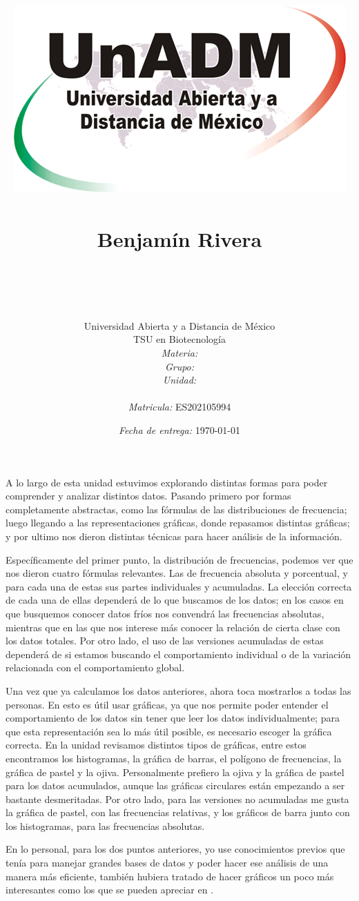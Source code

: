 \documentclass[12pt]{article}
\title{
	\includegraphics{../../../assets/logo-unadm} \\
	\ \\ Benjam\'in Rivera \\
	\bf{\titulo}\\\ \\}
\author{
	Universidad Abierta y a Distancia de México \\
	TSU en Biotecnolog\'ia \\
	\textit{Materia:} \materia \\
	\textit{Grupo:} \grupo \\
	\textit{Unidad:} \unidad \\
	\\
	\textit{Matricula:} ES202105994 }
\date{\textit{Fecha de entrega:} \today}
\begin{document}
\maketitle\newpage

	\par A lo largo de esta unidad estuvimos explorando distintas formas para poder comprender y analizar distintos datos. Pasando primero por formas completamente abstractas, como las fórmulas de las distribuciones de frecuencia; luego llegando a las representaciones gráficas, donde repasamos distintas gráficas; y por ultimo nos dieron distintas técnicas para hacer análisis de la información.
	
	\par Específicamente del primer punto, la distribución de frecuencias, podemos ver que nos dieron cuatro fórmulas relevantes. Las de frecuencia absoluta y porcentual, y para cada una de estas sus partes individuales y acumuladas. La elección correcta de cada una de ellas dependerá de lo que buscamos de los datos; en los casos en que busquemos conocer datos fríos nos convendrá las frecuencias absolutas, mientras que en las que nos interese más conocer la relación de cierta clase con los datos totales. Por otro lado, el uso de las versiones acumuladas de estas dependerá de si estamos buscando el comportamiento individual o de la variación relacionada con el comportamiento global.
	
	\par Una vez que ya calculamos los datos anteriores, ahora toca mostrarlos a todas las personas. En esto es útil usar gráficas, ya que nos permite poder entender el comportamiento de los datos sin tener que leer los datos individualmente; para que esta representación sea lo más útil posible, es necesario escoger la gráfica correcta. En la unidad revisamos distintos tipos de gráficas, entre estos encontramos los histogramas, la gráfica de barras, el polígono de frecuencias, la gráfica de pastel y la ojiva. Personalmente prefiero la ojiva y la gráfica de pastel para los datos acumulados, aunque las gráficas circulares están empezando a ser bastante desmeritadas. Por otro lado, para las versiones no acumuladas me gusta la gráfica de pastel, con las frecuencias relativas, y los gráficos de barra junto con los histogramas, para las frecuencias absolutas.
	
	\par En lo personal, para los dos puntos anteriores, yo use conocimientos previos que tenía para manejar grandes bases de datos y poder hacer ese análisis de una manera más eficiente, también hubiera tratado de hacer gráficos un poco más interesantes como los que se pueden apreciar en \cite{graficas}.
	
\end{document}
